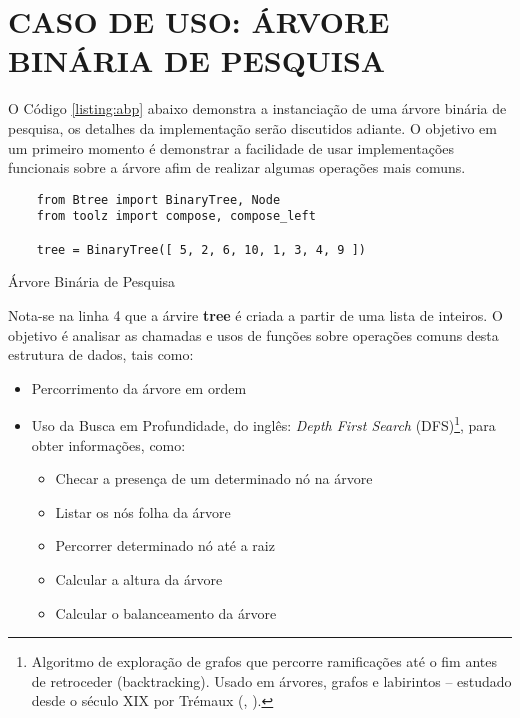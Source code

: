 \section{CASO DE USO: ÁRVORE BINÁRIA DE PESQUISA}

O Código \ref{listing:abp} abaixo demonstra a instanciação de uma árvore binária de pesquisa, os detalhes da implementação
serão discutidos adiante. O objetivo em um primeiro momento é demonstrar a facilidade de usar implementações funcionais
sobre a árvore afim de realizar algumas operações mais comuns.

\begin{listing}[!ht]
    \begin{verbatim}
    from Btree import BinaryTree, Node
    from toolz import compose, compose_left
    
    tree = BinaryTree([ 5, 2, 6, 10, 1, 3, 4, 9 ])
    \end{verbatim}
    \caption{Árvore Binária de Pesquisa}
    \label{listing:abp}
\end{listing}

Nota-se na linha 4 que a árvire \textbf{tree} é criada a partir de uma lista de inteiros. O objetivo
é analisar as chamadas e usos de funções sobre operações comuns desta estrutura de dados, tais como:

\begin{itemize}
    \item Percorrimento da árvore em ordem
    \item Uso da Busca em Profundidade, do inglês: \textit{Depth First Search} (DFS)\footnote{
        Algoritmo de exploração de grafos que percorre ramificações até o fim antes de retroceder (backtracking). Usado em árvores, grafos e labirintos – estudado desde o século XIX por Trémaux (\citeauthor{wiki_dfs}, \citeyear{wiki_dfs})\cite{wiki_dfs}.
    }, para obter informações, como:
    \begin{itemize}
        \item Checar a presença de um determinado nó na árvore
        \item Listar os nós folha da árvore
        \item Percorrer determinado nó até a raiz
        \item Calcular a altura da árvore
        \item Calcular o balanceamento da árvore
    \end{itemize}
\end{itemize}
